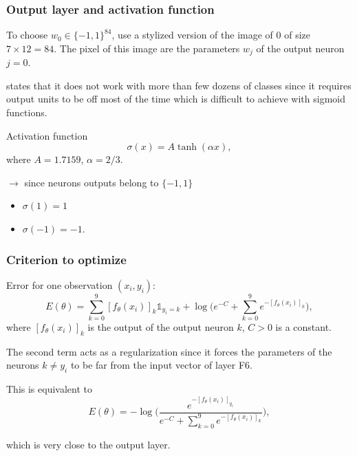 \begin{frame}
	\frametitle{Output layer and activation function}

	To choose $w_0 \in \{-1, 1\}^{84}$, use a stylized version of the image of $0$ of size $7\times 12 =84$. The pixel of this image are the parameters $w_j$ of the output neuron $j=0$.

	\medskip

	\smallskip

	\cite{lecun1998gradient} states that it does not work with more than few dozens of classes since it requires output units to be off most of the time which is difficult to achieve with sigmoid functions.

	\bigskip


	\begin{block}{Activation function}
	$$\sigma(x) = A \tanh (\alpha x),$$
	where $A = 1.7159$, $\alpha=2/3$.
	\end{block}

	\smallskip

	$\rightarrow$  since neurons outputs belong to $\{-1, 1\}$
	\begin{itemize}
		\item $\sigma(1) = 1$
		\item $\sigma(-1) = -1$.
	\end{itemize}

\end{frame}

\begin{frame}
	\frametitle{Criterion to optimize}

	Error for one observation $(x_i, y_i)$:
	$$
	E (\theta) = \sum_{k=0}^{9}  [f_{\theta}(x_i)]_k \mathds{1}_{y_i = k}
	+ \log \Big(e^{-C} + \sum_{k=0}^9 e^{- [f_{\theta}(x_i)]_k} \Big),
	$$
	where $[f_{\theta}(x_i)]_k$ is the output of the output neuron $k$, $C>0$ is a constant.

	\medskip

	The second term acts as a regularization since it forces the parameters of the neurons $k\neq y_i$ to be far from the input vector of layer F6.

	\pause
	\bigskip

	This is equivalent to
	$$
	E (\theta) = - \log \Big( \frac{e^{-[f_{\theta}(x_i)]_{y_i}}}{e^{-C} + \sum_{k=0}^9 e^{- [f_{\theta}(x_i)]_k} }\Big),
	$$

	\smallskip
	which is very close to the  output layer.
\end{frame}


